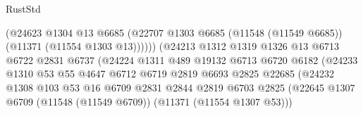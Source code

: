 \begin{lexlean}{RustStd}
\begin{coremodule}
                                          (@24623
                                            @1304
                                            @13
                                            @6685
                                            (@22707
                                              @1303
                                              @6685
                                              (@11548 (@11549 @6685))
                                              (@11371 (@11554 @1303 @13))))))
                                      (@24213
                                        @1312
                                        @1319
                                        @1326
                                        @13
                                        @6713
                                        @6722
                                        @2831
                                        @6737
                                        (@24224
                                          @1311
                                          @489
                                          @19132
                                          @6713
                                          @6720
                                          @6182
                                          (@24233
                                            @1310
                                            @53
                                            @55
                                            @4647
                                            @6712
                                            @6719
                                            @2819
                                            @6693
                                            @2825
                                            @22685
                                            (@24232
                                              @1308
                                              @103
                                              @53
                                              @16
                                              @6709
                                              @2831
                                              @2844
                                              @2819
                                              @6703
                                              @2825
                                              (@22645
                                                @1307
                                                @6709
                                                (@11548 (@11549 @6709))
                                                (@11371 (@11554 @1307 @53)))

\end{coremodule}
\end{lexlean}
